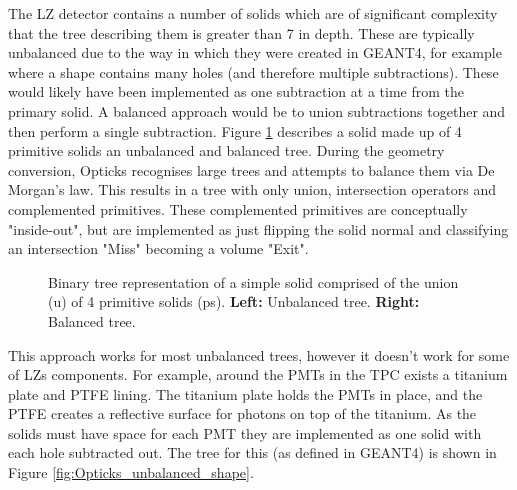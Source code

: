 \par
The LZ detector contains a number of solids which are of significant complexity that the tree describing them is greater than 7 in depth.
These are typically unbalanced due to the way in which they were created in GEANT4, for example where a shape contains many holes (and therefore multiple subtractions).
These would likely have been implemented as one subtraction at a time from the primary solid.
A balanced approach would be to union subtractions together and then perform a single subtraction.
Figure \ref{fig:UnionSolidBinaryTree} describes a solid made up of 4 primitive solids an unbalanced and balanced tree.
During the geometry conversion, Opticks recognises large trees and attempts to balance them via De Morgan's law.
This results in a tree with only union, intersection operators and complemented primitives.
These complemented primitives are conceptually "inside-out", but are implemented as just flipping the solid normal and classifying an intersection "Miss" becoming a volume "Exit".
\begin{figure}[!htpb]
\centering 
{}
\caption{Binary tree representation of a simple solid comprised of the union (u) of 4 primitive solids (ps). \textbf{Left:} Unbalanced tree. \textbf{Right:} Balanced tree.}
\label{fig:UnionSolidBinaryTree}
\end{figure}
\par
This approach works for most unbalanced trees, however it doesn't work for some of LZs components.
For example, around the PMTs in the TPC exists a titanium plate and PTFE lining.
The titanium plate holds the PMTs in place, and the PTFE creates a reflective surface for photons on top of the titanium.
As the solids must have space for each PMT they are implemented as one solid with each hole subtracted out.
The tree for this (as defined in GEANT4) is shown in Figure \ref{fig:Opticks_unbalanced_shape}.

